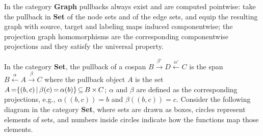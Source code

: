 In the category \textbf{Graph} pullbacks always exist and are computed pointwise: take the pullback in \textbf{Set} of the node sets and of the edge sets, and equip the resulting graph with source, target and labeling maps induced componentwise; the projection graph homomorphisms are the corresponding componentwise projections and they satisfy the universal property.
\begin{example} 
    \label{ex:cat:pbfsdljkgjasssss}
    In the category \textbf{Set},
    the pullback 
    of a cospan \(B \overset{\beta'}{\rightarrow} D \overset{\alpha'}{\leftarrow} C \) is the span \( B \overset{\alpha}{\leftarrow} A \overset{\beta}{\rightarrow} C \) where
    the pullback object $A$ is the set $A \mathop{=} \{(b,c) \mathop{\mid} \beta (c) \mathop{=} \alpha (b)\} \mathop{\subseteq} B \mathop{\times} C$; $\alpha$ and $\beta$ are defined as the corresponding projections, e.g., $\alpha((b, c)) \mathop{=} b$ and $\beta((b, c)) \mathop{=} c$.
    Consider the following diagram in the category \textbf{Set}, where 
    sets are drawn as boxes,
    circles represent elements of sets, and numbers inside circles indicate how the functions map those elements.
    \begin{center}
\end{center}
\end{example}
